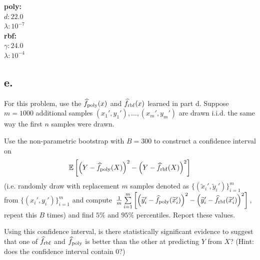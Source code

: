 \documentclass{article}
\newcommand{\1}{\mathbf{1}}
\newcommand{\E}{\mathbb{E}}
\begin{document}
{\begin{figure}[h]
\end{figure} 
\newpage
\textbf{poly:} \\
$d: 22.0$ \\
$\lambda: 10^{-7}$ \\ 
\textbf{rbf:} \\
$\gamma: 24.0$ \\
$\lambda: 10^{-4}$

\subsection*{e.}

For this problem, use the $\widehat{f}_{\rm poly}(x)$ and $\widehat{f}_{\rm rbf}(x)$ learned in part d. Suppose $m=1000$ additional samples $(x_1',y_1'),\dots,(x_m',y_m')$ are drawn i.i.d. the same way the first $n$ samples were drawn. 
  
  \medskip
  
  Use the non-parametric bootstrap with $B=300$ to construct a confidence interval on
  \[
    \E\left[ \left(Y-\widehat{f}_{\rm poly}(X)\right)^2 - \left(Y-\widehat{f}_{\rm rbf}(X)\right)^2 \right]
  \]
  (i.e. randomly draw with replacement $m$ samples denoted as $\{(\widetilde{x}_i',\widetilde{y}_i')\}_{i=1}^m$ from $\{(x_i',y_i')\}_{i=1}^m$ and compute $\frac{1}{m} \sum\limits_{i=1}^m \left[ \left(\widetilde{y}_i'-\widehat{f}_{\rm poly}(\widetilde{x}_i')\right)^2 - \left(\widetilde{y}_i'-\widehat{f}_{\rm rbf}(\widetilde{x}_i')\right)^2 \right]$, repeat this $B$ times) and find $5\%$ and $95\%$ percentiles. Report these values.
  
  \medskip
  
  Using this confidence interval, is there statistically significant evidence to suggest that one of $\widehat{f}_{\rm rbf}$ and $\widehat{f}_{\rm poly}$ is better than the other at predicting $Y$ from $X$? (Hint: does the confidence interval contain $0$?)

}
\end{document}

